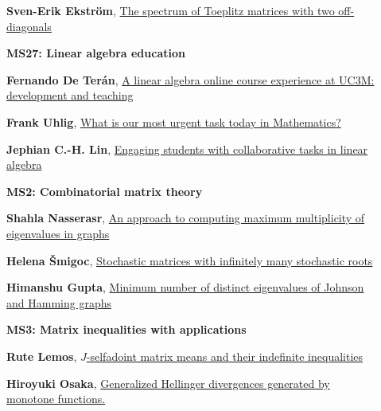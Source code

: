 \documentclass[ILAS2025-program.tex]{subfiles}
\begin{document}
\begin{description}
\begin{description}
        \item[] \hypertarget{up0258}{}\textbf{Sven-Erik Ekström}, \hyperlink{down0258}{The spectrum of Toeplitz matrices with two off-diagonals}
        \end{description}
    \begin{description}
    \item[] {\color{mstitle}\textbf{MS27: Linear algebra education}} 
    \item[] \hypertarget{up0259}{}\textbf{Fernando De Terán}, \hyperlink{down0259}{A linear algebra online course experience at UC3M: development and teaching}
        \item[] \hypertarget{up0260}{}\textbf{Frank Uhlig}, \hyperlink{down0260}{What is our most urgent task today in Mathematics?
}
        \item[] \hypertarget{up0261}{}\textbf{Jephian C.-H. Lin}, \hyperlink{down0261}{Engaging students with collaborative tasks in linear algebra
}
        \end{description}
    \begin{description}
    \item[] {\color{mstitle}\textbf{MS2: Combinatorial matrix theory}} 
    \item[] \hypertarget{up0262}{}\textbf{Shahla Nasserasr}, \hyperlink{down0262}{An approach to computing maximum multiplicity of eigenvalues in graphs}
        \item[] \hypertarget{up0263}{}\textbf{Helena Šmigoc}, \hyperlink{down0263}{Stochastic matrices with infinitely many stochastic roots}
        \item[] \hypertarget{up0264}{}\textbf{Himanshu Gupta}, \hyperlink{down0264}{Minimum number of distinct eigenvalues of Johnson and Hamming graphs}
        \end{description}
    \begin{description}
    \item[] {\color{mstitle}\textbf{MS3: Matrix inequalities with applications}} 
    \item[] \hypertarget{up0265}{}\textbf{Rute Lemos}, \hyperlink{down0265}{$J$-selfadoint matrix means and their indefinite inequalities}
        \item[] \hypertarget{up0266}{}\textbf{Hiroyuki Osaka}, \hyperlink{down0266}{Generalized Hellinger divergences generated by monotone functions.
}
\end{description}
\end{description}
\end{document}
